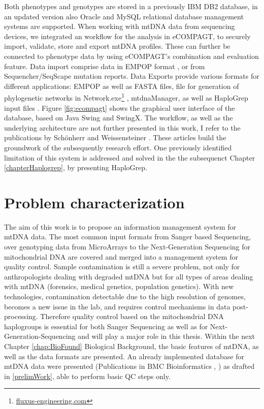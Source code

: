 Both phenotypes and genotypes are stored in a previously IBM DB2 database, in an updated version also Oracle and MySQL relational database management systems are supported. When working with mtDNA data from sequencing devices, we integrated an workflow for the analysis in eCOMPAGT, to securely import, validate, store and export mtDNA profiles.  These can further be connected to phenotype data by using eCOMPAGT's combination and evaluation feature. Data import comprise data in EMPOP format \cite{Parson2007}, or from Sequencher/SeqScape mutation reports. Data Exports provide various formats for different applications: EMPOP as well as FASTA files, file for generation of phylogenetic networks in Network.exe\footnote{\url{fluxus-engineering.com}}  \cite{Bandelt1999}, mtdnaManager\cite{Lee2008}, as well as HaploGrep input files \cite{Kloss-Brandstatter2011,Weissensteiner2016a}. Figure \ref{fig:ecompagt} shows the graphical user interface of the database, based on Java Swing and SwingX. The workflow, as well as the underlying architecture are not further presented in this work, I refer to the publications by Sch\"onherr and Weissensteiner \cite{Schoenherr2009,Weissensteiner2010}. These articles build the groundwork of the subsequently research effort. One previously identified limitation of this system is addressed and solved in the the subsequenct Chapter \ref{chapterHaplogrep}, by presenting HaploGrep.

\section{Problem characterization}
\label{sect:ProblChar}
The aim of this work is to propose an information management system for mtDNA data. 
The most common input formats from Sanger based Sequencing, over genotyping data from MicroArrays to the Next-Generation Sequencing for mitochondrial DNA  are covered and merged into a management system for quality control. Sample contamination is still a severe problem, not only for anthropologists dealing with degraded mtDNA but for all types of areas dealing with mtDNA (forensics, medical genetics, population genetics). With new technologies, contamination detectable due to the high resolution of genomes, becomes a new issue in the lab, and requires control mechanisms in data post-processing. Therefore quality control based on the mitochondrial DNA haplogroups is essential for both Sanger Sequencing as well as for Next-Generation-Sequencing and will play a major role in this thesis. Within the next Chapter \ref{chap:BioFound} Biological Background, the basic features of mtDNA, as well as the data formats are presented. An already implemented database for mtDNA data were presented (Publications in BMC Bioinformatics \cite{Schoenherr2009}, \cite{Weissensteiner2010}) as drafted in \ref{prelimWork}, able to perform basic QC steps only.

